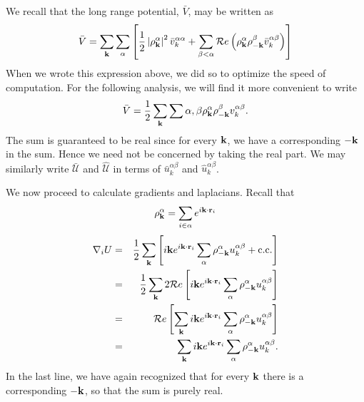 \documentclass{article}
\begin{document}
We recall that the long range potential, $\bar{V}$, may be written as
\begin{equation}
\bar{V} = \sum_{\mathbf{k}} \sum_{\alpha} \left[ 
\frac{1}{2} \left| \rho^\alpha_{\mathbf{k}}\right|^2 \bar{v}^{\alpha
  \alpha}_k + 
\sum_{\beta < \alpha} \mathcal{R}e \left( \rho^{\alpha}_{\mathbf{k}}
  \rho^\beta_{-\mathbf{k}} \bar{v}^{\alpha\beta}_k \right)
\right] 
\end{equation}
When we wrote this expression above, we did so to optimize the speed
of computation.  For the following analysis, we will find it more
convenient to write
\begin{equation}
\bar{V} = \frac{1}{2} \sum_{\mathbf{k}} \sum{\alpha, \beta} \rho_{\mathbf{k}}^\alpha
\rho_{-\mathbf{k}}^\beta v^{\alpha \beta}_k.
\end{equation}
The sum is guaranteed to be real since for every $\mathbf{k}$, we have a
corresponding $-\mathbf{k}$ in the sum.  Hence we need not be concerned by
taking the real part. We may similarly write $\bar{\mathcal{U}}$ and $\hat{\mathcal{U}}$ in
terms of $\bar{u}_k^{\alpha\beta}$ and $\hat{u}_k^{\alpha\beta}$.


We now proceed to calculate gradients and laplacians.
Recall that 
\begin{equation}
\rho_{\mathbf{k}}^\alpha = \sum_{i\in\alpha} e^{i\mathbf{k} \cdot \mathbf{r}_i}
\end{equation}
\begin{eqnarray}
\nabla_i U & = & \frac{1}{2}\sum_{\mathbf{k}} \left[ i\mathbf{k} e^{i\mathbf{k} \cdot \mathbf{r}_i} \sum_\alpha
\rho_{-\mathbf{k}}^\alpha u^{\alpha \beta}_k + \text{c.c.} \right] \\
& = & \frac{1}{2} \sum_{\mathbf{k}} 2\mathcal{R}e \left[i\mathbf{k} e^{i\mathbf{k} \cdot \mathbf{r}_i} \sum_\alpha
\rho_{-\mathbf{k}}^\alpha u^{\alpha \beta}_k\right] \\ 
& = & \mathcal{R}e \left[ \sum_{\mathbf{k}} i\mathbf{k} e^{i\mathbf{k} \cdot \mathbf{r}_i} \sum_\alpha
\rho_{-\mathbf{k}}^\alpha u^{\alpha \beta}_k \right] \\
& = & \sum_{\mathbf{k}} i\mathbf{k} e^{i\mathbf{k} \cdot \mathbf{r}_i} \sum_\alpha
\rho_{-\mathbf{k}}^\alpha u^{\alpha \beta}_k.
\end{eqnarray}
In the last line, we have again recognized that for every $\mathbf{k}$
there is a corresponding $-\mathbf{k}$, so that the sum is purely real.
\end{document}
